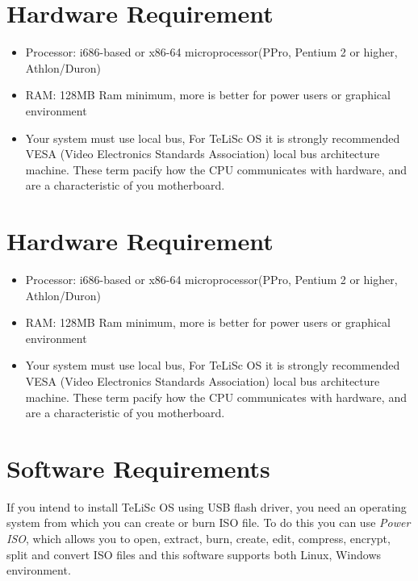 \section{Hardware Requirement}
\label{sec:1.3}
\begin{itemize}
    \item Processor: i686-based or x86-64 microprocessor(PPro, Pentium 2 or higher, Athlon/Duron)
    \item RAM: 128MB Ram minimum, more is better for power users or graphical environment
    \item Your system must use local bus, For TeLiSc OS it is strongly recommended VESA (Video Electronics Standards Association) local bus architecture machine. These term pacify how the CPU communicates with hardware, and are a characteristic of you motherboard. 
\end{itemize}




\section{Hardware Requirement}
\label{sec:1.4}
\begin{itemize}
    \item Processor: i686-based or x86-64 microprocessor(PPro, Pentium 2 or higher, Athlon/Duron)
    \item RAM: 128MB Ram minimum, more is better for power users or graphical environment
    \item Your system must use local bus, For TeLiSc OS it is strongly recommended VESA (Video Electronics Standards Association) local bus architecture machine. These term pacify how the CPU communicates with hardware, and are a characteristic of you motherboard. 
\end{itemize}

\section{Software Requirements}
\label{sec:1.5}
If you intend to install TeLiSc OS using USB flash driver, you need an operating system from which you can create or burn ISO file. To do this you can use \textit{Power ISO}, which allows you to open, extract, burn, create, edit, compress, encrypt, split and convert ISO files and this software supports both Linux, Windows environment. 

